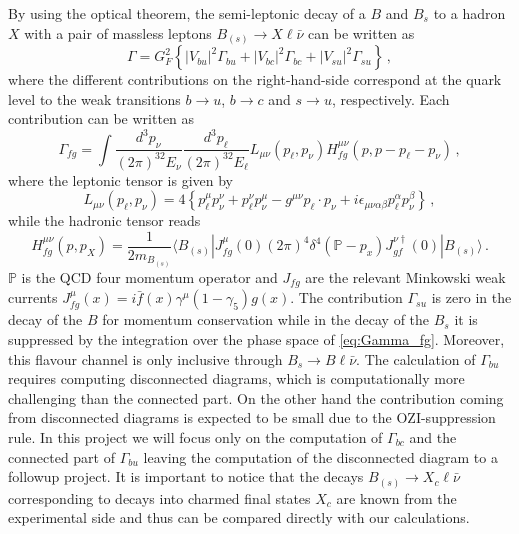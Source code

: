 By using the optical theorem, the semi-leptonic decay of a $B$ and $B_s$
to a hadron $X$ with a pair of massless leptons $B_{(s)} \to X\ell\bar\nu$ can be written as
\begin{equation}
  \Gamma = G^2_F\left\{ |V_{bu} |^2 \Gamma_{bu} + |V_{bc} |^2 \Gamma_{bc} + |V_{su} |^2 \Gamma_{su}
  \right\}\,,
\end{equation}
where the different contributions on the right-hand-side correspond at the quark level
to the weak transitions $b \to u$, $b \to c$ and $s \to u$, respectively.
Each contribution can be written as
\begin{equation}\label{eq:Gamma_fg}
  \Gamma_{fg}=\int \frac{d^3p_\nu}{(2\pi)^32E_\nu}\frac{d^3p_\ell}{(2\pi)^32E_\ell}
  L_{\mu\nu}(p_\ell, p_\nu) H^{\mu\nu}_{fg}(p,p-p_\ell-p_\nu)\,,
\end{equation}
where the leptonic tensor is given by
\begin{equation}
  L_{\mu\nu}(p_\ell, p_\nu) =4\left\{p_\ell^\mu p_\nu^\nu +p_\ell^\nu
  p_\nu^\mu - g^{\mu\nu} p_\ell\cdot p_\nu+
  i\epsilon_{\mu\nu\alpha\beta} p_\ell^\alpha p_\nu^\beta\right\}\,,
\end{equation}
while the hadronic tensor reads
\begin{equation}
  H^{\mu\nu}_{fg}(p,p_X)=\frac{1}{2m_{B_{(s)}}}\langle B_{(s)}| J^\mu_{fg}(0)(2\pi)^4
  \delta^4(\mathbb{P}-p_x) J^{\nu\dagger}_{gf} (0)| B_{(s)}\rangle\,.
\end{equation}
$\mathbb{P}$ is the QCD four momentum operator and $J_{fg}$ are the
relevant Minkowski weak currents $J_{fg}^\mu(x)=i\bar
  f(x)\gamma^\mu(1-\gamma_5)g(x)$.
The contribution $\Gamma_{su}$ is zero in the decay of the $B$ for
momentum conservation while  in the decay of the $B_{s}$ it is
suppressed by the integration over the phase space of
\eqref{eq:Gamma_fg}. Moreover, this flavour channel is only inclusive
through $B_s\to B\ell\bar\nu$. 
The calculation of $\Gamma_{bu}$  requires computing disconnected
diagrams, which is computationally more challenging than the connected
part. 
On the other hand the contribution coming from disconnected diagrams
is expected to be small due to the OZI-suppression rule. 
In this project we will focus only on the computation of $\Gamma_{bc}$
and the connected part of $\Gamma_{bu}$ leaving the computation of the
disconnected diagram to a followup project. 
It is important to notice that the decays $B_{(s)} \to X_c\ell\bar\nu$ corresponding to decays into charmed final states $X_c$ are known from the experimental side and thus can be compared directly with our calculations.

